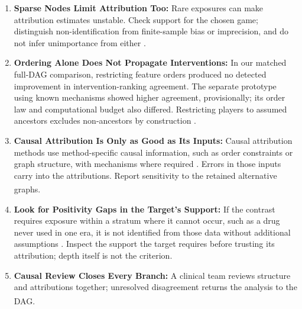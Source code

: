 \documentclass[10pt,a4paper]{article}
\begin{document}
\begin{enumerate}
    \item \textbf{Sparse Nodes Limit Attribution Too:} Rare exposures can make attribution estimates unstable. Check support for the chosen game; distinguish non-identification from finite-sample bias or imprecision, and do not infer unimportance from either \citep{Petersen2012}.
    \item \textbf{Ordering Alone Does Not Propagate Interventions:} In our matched full-DAG comparison, restricting feature orders produced no detected improvement in intervention-ranking agreement. The separate prototype using known mechanisms showed higher agreement, provisionally; its order law and computational budget also differed. Restricting players to assumed ancestors excludes non-ancestors by construction \citep{Heskes2020,Jung2022,Frye2020}.
    \item \textbf{Causal Attribution Is Only as Good as Its Inputs:} Causal attribution methods use method-specific causal information, such as order constraints or graph structure, with mechanisms where required \citep{Frye2020,Heskes2020,Jung2022}. Errors in those inputs carry into the attributions. Report sensitivity to the retained alternative graphs.\textsuperscript{\dag}
    \item \textbf{Look for Positivity Gaps in the Target's Support:} If the contrast requires exposure within a stratum where it cannot occur, such as a drug never used in one era, it is not identified from those data without additional assumptions \citep{Petersen2012}. Inspect the support the target requires before trusting its attribution; depth itself is not the criterion.
    \item \textbf{Causal Review Closes Every Branch:} A clinical team reviews structure and attributions together; unresolved disagreement returns the analysis to the DAG.\textsuperscript{\dag}
\end{enumerate}



\end{document}
